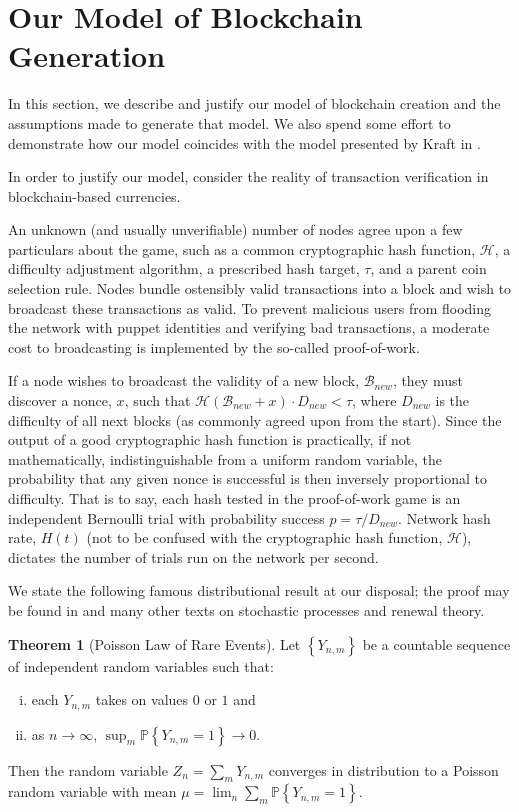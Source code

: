 \documentclass[12pt,english]{mrl}
\theoremstyle{definition}
\newtheorem{thm}[lem]{Theorem}
\numberwithin{equation}{section}
\numberwithin{figure}{section}
\numberwithin{equation}{section}
\numberwithin{equation}{section}
\numberwithin{figure}{section}
\begin{document}
\section{Our Model of Blockchain Generation}\label{modelBlockChainCreation}

In this section, we describe and justify our model of blockchain creation and the assumptions made to generate that model. We also spend some effort to demonstrate how our model coincides with the model presented by Kraft in \cite{kraft2015difficulty}.

In order to justify our model, consider the reality of transaction verification in blockchain-based currencies. 

An unknown (and usually unverifiable) number of nodes agree upon a few particulars about the game, such as a common cryptographic hash function, $\mathcal{H}$, a difficulty adjustment algorithm, a prescribed hash target, $\tau$, and a parent coin selection rule. Nodes bundle ostensibly valid transactions into a block and wish to broadcast these transactions as valid. To prevent malicious users from flooding the network with puppet identities and verifying bad transactions, a moderate cost to broadcasting is implemented by the so-called proof-of-work. 

If a node wishes to broadcast the validity of a new block, $\mathcal{B}_{new}$, they must discover a nonce, $x$, such that $\mathcal{H}\left(\mathcal{B}_{new} + x\right)\cdot D_{new} < \tau$, where $D_{new}$ is the difficulty of all next blocks (as commonly agreed upon from the start). Since the output of a good cryptographic hash function is practically, if not mathematically, indistinguishable from a uniform random variable, the probability that any given nonce is successful is then inversely proportional to difficulty. That is to say, each hash tested in the proof-of-work game is an independent Bernoulli trial with probability success $p = \tau/D_{new}$. Network hash rate, $H(t)$ (not to be confused with the cryptographic hash function, $\mathcal{H}$), dictates the number of trials run on the network per second. 

We state the following famous distributional result at our disposal; the proof may be found in \cite{serfozo2009basics} and many other texts on stochastic processes and renewal theory. 

\begin{thm}[Poisson Law of Rare Events]
Let $\left\{Y_{n,m}\right\}$ be a countable sequence of independent random variables such that:
\begin{enumerate}[(i)]
\item each $Y_{n,m}$ takes on values $0$ or $1$ and
\item as $n \to \infty$, $\sup_m \mathbb{P}\left\{Y_{n,m} = 1\right\} \to 0$.
\end{enumerate}
Then the random variable $Z_n = \sum_m Y_{n,m}$ converges in distribution to a Poisson random variable with mean $\mu = \lim_{n} \sum_{m} \mathbb{P}\left\{Y_{n,m} = 1\right\}$.
\end{thm}
\end{document}
